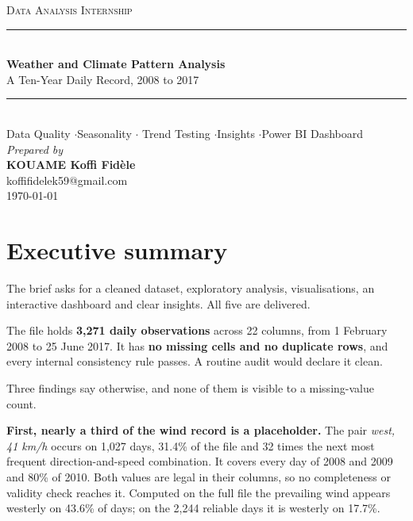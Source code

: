 \documentclass[12pt,a4paper]{article}
\newcommand{\thinrule}{\textcolor{rulegrey}{\rule{\linewidth}{0.4pt}}}
\begin{document}
\begin{titlepage}
\centering
\vspace*{3.2cm}

{\large\scshape Data Analysis Internship}\\[2.4cm]

\thinrule\\[0.85cm]
{\LARGE\bfseries Weather and Climate Pattern Analysis}\\[0.55cm]
{\large A Ten-Year Daily Record, 2008 to 2017}\\[0.85cm]
\thinrule\\[1.1cm]

{\normalsize\color{soft}Data Quality \quad$\cdot$\quad Seasonality \quad$\cdot$\quad
Trend Testing \quad$\cdot$\quad Insights \quad$\cdot$\quad Power BI Dashboard}\\[3.4cm]

{\large\itshape Prepared by}\\[0.5cm]
{\Large\bfseries KOUAME Koffi Fidèle}\\[0.5cm]
{\normalsize\color{soft}koffifidelek59@gmail.com}\\[1.6cm]

{\large \today}
\vfill
\end{titlepage}

\tableofcontents
\newpage

\section{Executive summary}

The brief asks for a cleaned dataset, exploratory analysis, visualisations, an
interactive dashboard and clear insights. All five are delivered.

The file holds \textbf{3{,}271 daily observations} across 22 columns, from
1 February 2008 to 25 June 2017. It has \textbf{no missing cells and no duplicate
rows}, and every internal consistency rule passes. A routine audit would declare it
clean.

Three findings say otherwise, and none of them is visible to a missing-value count.

\textbf{First, nearly a third of the wind record is a placeholder.} The pair
\emph{west, 41 km/h} occurs on 1{,}027 days, 31.4\% of the file and 32 times the next
most frequent direction-and-speed combination. It covers every day of 2008 and 2009
and 80\% of 2010. Both values are legal in their columns, so no completeness or
validity check reaches it. Computed on the full file the prevailing wind appears
westerly on 43.6\% of days; on the 2{,}244 reliable days it is westerly on 17.7\%.
\end{document}
